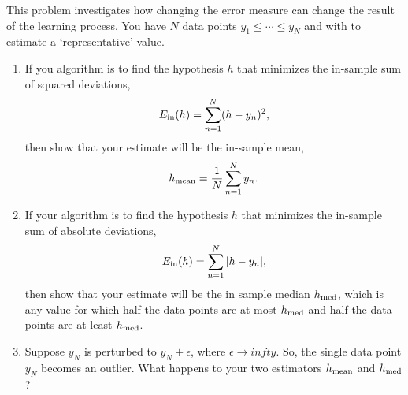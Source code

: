 \documentclass{amsart}
\begin{document}
\begin{problem}[1.12]
  This problem investigates how changing the error measure can change the result
  of the learning process. You have \(N\) data points \(y_1 \leq \cdots \leq
  y_N\) and with to estimate a `representative' value.
  \begin{enumerate}
    \item If you algorithm is to find the hypothesis \(h\) that minimizes the
      in-sample sum of squared deviations,
      \begin{equation*}
        E_{\textup{in}}(h) = \sum_{n=1}^N (h - y_n)^2,
      \end{equation*}
      then show that your estimate will be the in-sample mean,
      \begin{equation*}
        h_{\textup{mean}} = \frac{1}{N} \sum_{n=1}^N y_n.
      \end{equation*}
    \item If your algorithm is to find the hypothesis \(h\) that minimizes the
      in-sample sum of absolute deviations,
      \begin{equation*}
        E_{\textup{in}}(h) = \sum_{n=1}^N |h - y_n|,
      \end{equation*}
      then show that your estimate will be the in sample median
      \(h_{\textup{med}}\), which is any value for which half the data
      points are at most \(h_{\textup{med}}\) and half the data points
      are at least \(h_{\textup{med}}\).
    \item Suppose \(y_N\) is perturbed to \(y_N + \epsilon\), where
      \(\epsilon \to infty\). So, the single data point \(y_N\) becomes an
      outlier. What happens to your two estimators \(h_{\textup{mean}}\) and
      \(h_{\textup{med}}\)?
  \end{enumerate}
\end{problem}
\end{document}
